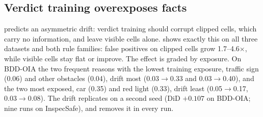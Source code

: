 \subsection{Verdict training overexposes facts}
\label{sec:exp-over}

\begin{table}[t]\centering\small
\caption{\textbf{Overexposure.} False-positive rate on \emph{visible} cells (facts on hazard-free images: switching one on would change the verdict) and \emph{clipped} cells (absent facts on images whose verdict is already decided). DiD: difference-in-differences of verdict-only against zero-shot (clipped drift minus visible drift); all $p<0.001$, paired bootstrap over images.}
\label{tab:over}
\end{table}

 predicts an asymmetric drift: verdict training should corrupt clipped cells, which carry no information, and leave visible cells alone.  shows exactly this on all three datasets and both rule families: false positives on clipped cells grow 1.7--4.6$\times$, while visible cells stay flat or improve. The effect is graded by exposure. On BDD-OIA the two frequent reasons with the lowest training exposure, traffic sign (0.06) and other obstacles (0.04), drift most (0.03$\to$0.33 and 0.03$\to$0.40), and the two most exposed, car (0.35) and red light (0.33), drift least (0.05$\to$0.17, 0.03$\to$0.08). The drift replicates on a second seed (DiD $+0.107$ on BDD-OIA; nine runs on InspecSafe), and \lux removes it in every run.

